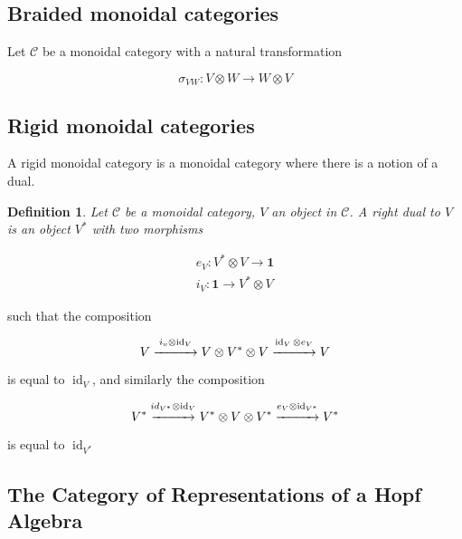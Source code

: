 \documentclass[]{article}
\newtheorem{defn}[theorem]{Definition}
\newcommand{\id}{\operatorname{id}}
\numberwithin{equation}{subsection}
\begin{document}
\subsection{Braided monoidal categories}

Let $\mathcal{C}$ be a monoidal category with a natural transformation 

\begin{equation}
    \sigma_{VW} : V \otimes W \to W \otimes V
\end{equation}

\subsection{Rigid monoidal categories}
A rigid monoidal category is a monoidal category where there is a notion of a dual. 

\begin{defn}
    Let $\mathcal{C}$ be a monoidal category, $V$ an object in $\mathcal{C}$. A \emph{right dual} to $V$ is an object $V^*$ with two morphisms

    \begin{align}
        e_V: V^* \otimes V \to \mathbf{1}  \\
        i_V: \mathbf{1} \to V^* \otimes V
    \end{align}
\end{defn}

such that the composition

\begin{equation}
    V \stackrel{i_v \otimes \id_V}{\xrightarrow{\hspace*{1cm}}} V \otimes V^*
    \otimes V  \stackrel{\id_V \otimes e_V}{\xrightarrow{\hspace*{1cm}}} V
\end{equation}

is equal to $\id_V$, and similarly the composition

\begin{equation}
    V^* \stackrel{id_{V^*} \otimes \id_V}{\xrightarrow{\hspace*{1cm}}} V^*
    \otimes V \otimes V^*  \stackrel{e_V \otimes
    \id_{V^*}}{\xrightarrow{\hspace*{1cm}}} V^*
\end{equation}

is equal to $\id_{V^*}$


\subsection{The Category of Representations of a Hopf Algebra}
\end{document}
